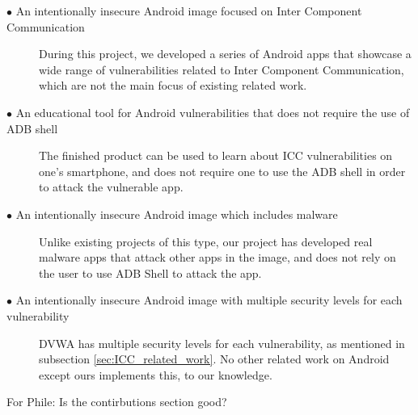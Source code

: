 		\begin{description}	
		
			\item[$\bullet$ An intentionally insecure Android image focused on Inter Component Communication]\hfill
			
			During this project, we developed a series of Android apps that showcase a wide range of vulnerabilities related to Inter Component Communication, which are not the main focus of existing related work. 
			
			\item[$\bullet$ An educational tool for Android vulnerabilities that does not require the use of ADB shell]\hfill
			
			The finished product can be used to learn about ICC vulnerabilities on one's smartphone, and does not require one to use the ADB shell in order to attack the vulnerable app.
			
			\item[$\bullet$ An intentionally insecure Android image which includes malware]\hfill
						
			Unlike existing projects of this type, our project has developed real malware apps that attack other apps in the image, and does not rely on the user to use ADB Shell to attack the app.
			
			\item[$\bullet$ An intentionally insecure Android image with multiple security levels for each vulnerability]\hfill
			
			DVWA has multiple security levels for each vulnerability, as mentioned in subsection \ref{sec:ICC_related_work}. No other related work on Android except ours implements this, to our knowledge.
			
		\end{description}
		
		For Phile: Is the contirbutions section good?